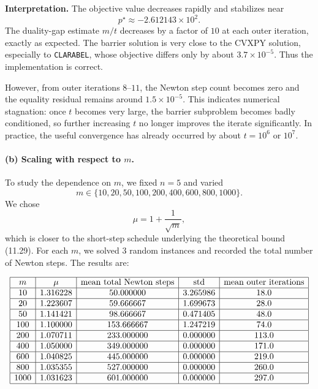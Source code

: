\documentclass[11pt,letter,notitlepage]{article}
\theoremstyle{definition}
\begin{document}
\begin{solution}
\textbf{Interpretation.}
The objective value decreases rapidly and stabilizes near
\[
p^\star \approx -2.612143\times 10^2.
\]
The duality-gap estimate $m/t$ decreases by a factor of $10$ at each outer iteration, exactly as expected. The barrier solution is very close to the CVXPY solution, especially to \texttt{CLARABEL}, whose objective differs only by about $3.7\times 10^{-5}$. Thus the implementation is correct.

However, from outer iterations $8$--$11$, the Newton step count becomes zero and the equality residual remains around $1.5\times 10^{-5}$. This indicates numerical stagnation: once $t$ becomes very large, the barrier subproblem becomes badly conditioned, so further increasing $t$ no longer improves the iterate significantly. In practice, the useful convergence has already occurred by about $t=10^6$ or $10^7$.

\paragraph{(b) Scaling with respect to $m$.}
To study the dependence on $m$, we fixed $n=5$ and varied
\[
m\in\{10,20,50,100,200,400,600,800,1000\}.
\]
We chose
\[
\mu = 1+\frac{1}{\sqrt{m}},
\]
which is closer to the short-step schedule underlying the theoretical bound (11.29). For each $m$, we solved $3$ random instances and recorded the total number of Newton steps. The results are:

\[
\begin{array}{|c|c|c|c|c|}
\hline
m & \mu & \text{mean total Newton steps} & \text{std} & \text{mean outer iterations}\\
\hline
10   & 1.316228 & 50.000000  & 3.265986 & 18.0\\
\hline
20   & 1.223607 & 59.666667  & 1.699673 & 28.0\\
\hline
50   & 1.141421 & 98.666667  & 0.471405 & 48.0\\
\hline
100  & 1.100000 & 153.666667 & 1.247219 & 74.0\\
\hline
200  & 1.070711 & 233.000000 & 0.000000 & 113.0\\
\hline
400  & 1.050000 & 349.000000 & 0.000000 & 171.0\\
\hline
600  & 1.040825 & 445.000000 & 0.000000 & 219.0\\
\hline
800  & 1.035355 & 527.000000 & 0.000000 & 260.0\\
\hline
1000 & 1.031623 & 601.000000 & 0.000000 & 297.0\\
\hline
\end{array}
\]


\end{solution}
\end{document}
